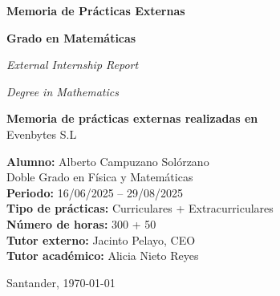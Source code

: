 \begin{titlepage}
\begin{center}
{\Huge \textbf{Memoria de Prácticas Externas}}

\vspace{0.5cm}

{\Huge \textbf{Grado en Matemáticas}}

\vspace{0.5cm}

{\Large \textit{External Internship Report}}

\vspace{0.5cm}

{\Large \textit{Degree in Mathematics}}

\vspace{0.5cm}

\vspace{1cm}

\textbf{Memoria de prácticas externas realizadas en}\\[0.5cm]
{\large Evenbytes S.L}

\vfill

\textbf{Alumno:} Alberto Campuzano Solórzano \\
Doble Grado en Física y Matemáticas \\[0.3cm]
\textbf{Periodo:} 16/06/2025 – 29/08/2025 \\
\textbf{Tipo de prácticas:} Curriculares + Extracurriculares \\
\textbf{Número de horas:} 300 + 50 \\[0.5cm]
\textbf{Tutor externo:} Jacinto Pelayo, CEO \\
\textbf{Tutor académico:} Alicia Nieto Reyes

\vspace{1cm}

Santander, \today

\end{center}
\end{titlepage}